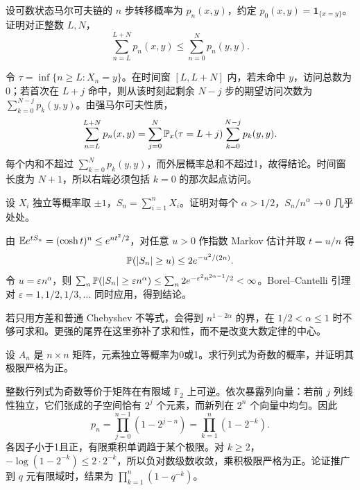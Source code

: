 \begin{example}[原题2：马尔可夫链的访问概率和]\label{yau:2021-2}
设可数状态马尔可夫链的 $n$ 步转移概率为 $p_n(x,y)$，约定 $p_0(x,y)=\mathbf1_{\{x=y\}}$。证明对正整数 $L,N$，
\[
\sum_{n=L}^{L+N}p_n(x,y)\le\sum_{n=0}^Np_n(y,y).
\]
\end{example}
\begin{solve}
令 $\tau=\inf\{n\ge L:X_n=y\}$。在时间窗 $[L,L+N]$ 内，若未命中 $y$，访问总数为0；若首次在 $L+j$ 命中，则从该时刻起剩余 $N-j$ 步的期望访问次数为 $\sum_{k=0}^{N-j}p_k(y,y)$。由强马尔可夫性质，
\[
\sum_{n=L}^{L+N}p_n(x,y)=\sum_{j=0}^N\mathbb P_x(\tau=L+j)\sum_{k=0}^{N-j}p_k(y,y).
\]
每个内和不超过 $\sum_{k=0}^Np_k(y,y)$，而外层概率总和不超过1，故得结论。时间窗长度为 $N+1$，所以右端必须包括 $k=0$ 的那次起点访问。
\end{solve}

\begin{example}[原题3：随机符号和的几乎处处增长率]\label{yau:2021-3}
设 $X_i$ 独立等概率取 $\pm1$，$S_n=\sum_{i=1}^nX_i$。证明对每个 $\alpha>1/2$，$S_n/n^\alpha\to0$ 几乎处处。
\end{example}
\begin{solve}
由 $\mathbb E e^{tS_n}=(\cosh t)^n\le e^{nt^2/2}$，对任意 $u>0$ 作指数 Markov 估计并取 $t=u/n$ 得
\[
\mathbb P(|S_n|\ge u)\le2e^{-u^2/(2n)}.
\]
令 $u=\varepsilon n^\alpha$，则 $\sum_n\mathbb P(|S_n|\ge\varepsilon n^\alpha)\le\sum_n2e^{-\varepsilon^2n^{2\alpha-1}/2}<\infty$。Borel--Cantelli 引理对 $\varepsilon=1,1/2,1/3,\ldots$ 同时应用，得到结论。

若只用方差和普通 Chebyshev 不等式，会得到 $n^{1-2\alpha}$ 的界，在 $1/2<\alpha\le1$ 时不够可求和。更强的尾界在这里弥补了求和性，而不是改变大数定律的中心。
\end{solve}

\begin{example}[原题4：随机零一矩阵行列式的奇偶性]\label{yau:2021-4}
设 $A_n$ 是 $n\times n$ 矩阵，元素独立等概率为0或1。求行列式为奇数的概率，并证明其极限严格为正。
\end{example}
\begin{solve}
整数行列式为奇数等价于矩阵在有限域 $\mathbb F_2$ 上可逆。依次暴露列向量：若前 $j$ 列线性独立，它们张成的子空间恰有 $2^j$ 个元素，而新列在 $2^n$ 个向量中均匀。因此
\[
p_n=\prod_{j=0}^{n-1}(1-2^{j-n})=\prod_{k=1}^n(1-2^{-k}).
\]
各因子小于1且正，有限乘积单调趋于某个极限。对 $k\ge2$，$-\log(1-2^{-k})\le2\cdot2^{-k}$，所以负对数级数收敛，乘积极限严格为正。论证推广到 $q$ 元有限域时，结果为 $\prod_{k=1}^n(1-q^{-k})$。
\end{solve}

